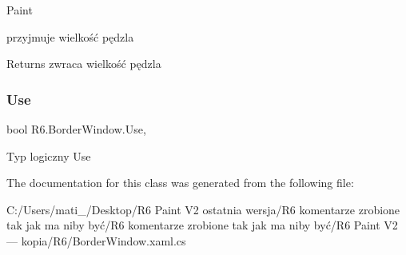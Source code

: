 Paint 

przyjmuje wielkość pędzla 

\begin{DoxyReturn}{Returns}
zwraca wielkość pędzla 
\end{DoxyReturn}
\mbox{\label{class_r6_1_1_border_window_a9b7f2a1fddfc5036c4f02413ad76533d}} 
\subsubsection{\texorpdfstring{Use}{Use}}
{\footnotesize\ttfamily bool R6.\+Border\+Window.\+Use\hspace{0.3cm}{\ttfamily [get]}, {\ttfamily [set]}}



Typ logiczny Use 



The documentation for this class was generated from the following file\+:\begin{DoxyCompactItemize}
\item 
C\+:/\+Users/mati\+\_\+/\+Desktop/\+R6 Paint V2 ostatnia wersja/\+R6 komentarze zrobione tak jak ma niby być/\+R6 komentarze zrobione tak jak ma niby być/\+R6 Paint V2 — kopia/\+R6/Border\+Window.\+xaml.\+cs\end{DoxyCompactItemize}
